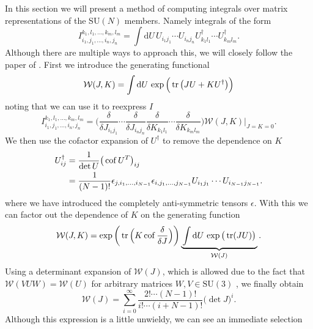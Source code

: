 In this section we will present a method of computing integrals over
matrix representations of the SU$(N)$ members. Namely integrals of the form
%
\begin{equation}
  I_{i_1,j_1,...,i_n,j_n}^{k_1,l_1,...,k_m,l_m} = \int \mathrm{d} U \,
    U_{i_1j_1} \cdots U_{i_nj_n} U^{\dagger}_{k_1l_1} \cdots U^{\dagger}_{k_ml_m}.
\end{equation}
%
Although there are multiple ways to approach this, we will closely follow the
paper of \citep{Creutz:1977yy,Creutz:1978ub}. First we introduce the generating
functional
%
\begin{equation}
  \mathcal{W}(J,K) = \int \mathrm{d} U \, \exp \Big( \operatorname{tr} \big(J U + K U^{\dagger}\big) \Big)
\end{equation}
%
noting that we can use it to reexpress $I$
%
\begin{equation}
  I_{i_1,j_1,...,i_n,j_n}^{k_1,l_1,...,k_m,l_m} = \bigg(
    \frac{\delta}{\delta J_{i_1j_1}} \cdots \frac{\delta}{\delta J_{i_nj_n}}
    \frac{\delta}{\delta K_{k_1l_1}} \cdots \frac{\delta}{\delta K_{k_ml_m}}
    \bigg) \mathcal{W}(J,K) \bigg|_{J=K=0}.
\end{equation}
%
We then use the cofactor expansion of $U^{\dagger}$ to remove the dependence on
$K$
%
\begin{align}
  U^{\dagger}_{ij} &= \frac{1}{\det U} \big( \operatorname{cof} U^T \big)_{ij} \nonumber\\
  &= \frac{1}{(N-1)!} \epsilon_{j, i_1, \dots, i_{N-1}} \epsilon_{i, j_1, \dots, j_{N-1}}
    U_{i_1j_1} \cdots U_{i_{N-1}j_{N-1}}.
\end{align}
%
where we have introduced the completely anti-symmetric tensors $\epsilon$.
With this we can factor out the dependence of $K$ on the generating function
%
\begin{equation}
  \mathcal{W}(J,K) = \exp\bigg( \operatorname{tr} \Big( K \operatorname{cof} \frac{\delta}{\delta J} \Big) \bigg)
    \underbrace{\,\int \mathrm{d} U \, \exp \big( \operatorname{tr} (JU) \big)\,}_{\mathcal{W}(J)}.
\end{equation}
%
Using a determinant expansion of $\mathcal{W}(J)$, which is allowed due to the fact that
$\mathcal{W}(VUW) = \mathcal{W}(U)$ for arbitrary matrices $W, V \in
\text{SU}(3)$ \citep{Creutz:1977yy}, we finally obtain
%
\begin{equation}
  \mathcal{W}(J) = \sum_{i=0}^{\infty} \frac{2! \cdots (N-1)!}{i! \cdots
    (i+N-1)!} \big(\det J\big)^i.
\end{equation}
%
Although this expression is a little unwieldy, we can see an immediate selection
